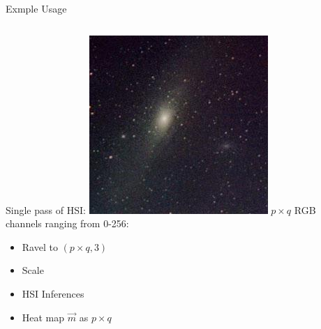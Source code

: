 \begin{frame}{Exmple Usage}
    \begin{columns}
        \begin{column}{.4\textwidth}
            Single pass of HSI:
            \includegraphics[width=.9\textwidth]{../Images/galaxy_256.jpeg}            
            $p\times q$ RGB channels ranging from 0-256:
            \begin{itemize}
                \item Ravel to $(p\times q, 3)$
                \item Scale
                \item HSI Inferences
                \item Heat map $\vec{m}$  as $p\times q$
            \end{itemize}
        \end{column}
        \begin{column}{.67\textwidth}

\end{column}
\end{columns}
\end{frame}
